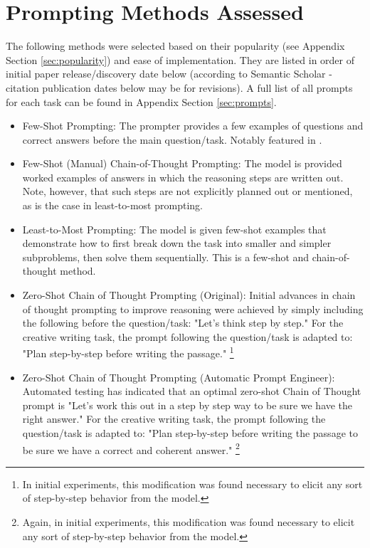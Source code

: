 \documentclass[11pt]{article}
\begin{document}
\section*{Prompting Methods Assessed}

The following methods were selected based on their popularity (see Appendix Section \ref{sec:popularity}) and ease of implementation. They are listed in order of initial paper release/discovery date below (according to Semantic Scholar - citation publication dates below may be for revisions). A full list of all prompts for each task can be found in Appendix Section \ref{sec:prompts}.

\begin{itemize}
  \item Few-Shot Prompting: The prompter provides a few examples of questions and correct answers before the main question/task. Notably featured in \citealp{brown_language_2020}.
  \item Few-Shot (Manual) Chain-of-Thought Prompting: The model is provided worked examples of answers in which the reasoning steps are written out. \cite{wei_chain--thought_nodate} Note, however, that such steps are not explicitly planned out or mentioned, as is the case in least-to-most prompting.
  \item Least-to-Most Prompting: The model is given few-shot examples that demonstrate how to first break down the task into smaller and simpler subproblems, then solve them sequentially. \cite{zhou_least--most_2023} This is a few-shot and chain-of-thought method.
  \item Zero-Shot Chain of Thought Prompting (Original): Initial advances in chain of thought prompting to improve reasoning were achieved by simply including the following before the question/task: "Let's think step by step." \cite{kojima_large_2023} For the creative writing task, the prompt following the question/task is adapted to: "Plan step-by-step before writing the passage." \footnote{In initial experiments, this modification was found necessary to elicit any sort of step-by-step behavior from the model.}
  \item Zero-Shot Chain of Thought Prompting (Automatic Prompt Engineer): Automated testing has indicated that an optimal zero-shot Chain of Thought prompt is "Let's work this out in a step by step way to be sure we have the right answer." \cite{zhou_large_2022} For the creative writing task, the prompt following the question/task is adapted to: "Plan step-by-step before writing the passage to be sure we have a correct and coherent answer." \footnote{Again, in initial experiments, this modification was found necessary to elicit any sort of step-by-step behavior from the model.}

\end{itemize}
\end{document}
